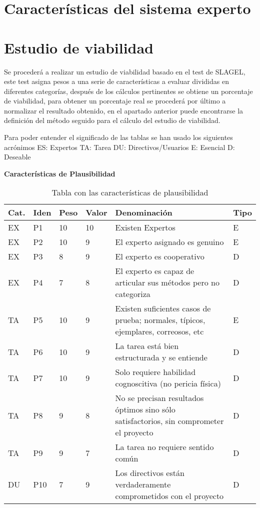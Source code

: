 \section{Características del sistema experto}



\section{Estudio de viabilidad}
Se procederá a realizar un estudio de viabilidad basado en el test de SLAGEL, este test
 asigna pesos a una serie de características a evaluar divididas en diferentes categorías,
 después de los cálculos pertinentes se obtiene un porcentaje de viabilidad, para obtener
 un porcentaje real se procederá por último a normalizar el resultado obtenido, en el apartado
 anterior puede encontrarse la definición del método seguido para el cálculo del estudio de
 viabilidad.

Para poder entender el significado de las tablas se han usado los siguientes acrónimos
 ES: Expertos TA: Tarea DU: Directivos/Usuarios E: Esencial D: Deseable

\textbf{Características de Plausibilidad}

\begin{table}[htb]%
  \centering
  \caption{Tabla con las características de plausibilidad}
  \label{tab:anchura}
  \begin{tabular}{ | l | l | l | l | p{8cm} | l | }
    \hline
    Cat. & Iden & Peso & Valor & Denominación & Tipo \\ \hline
    EX & P1 & 10 & 10 & Existen Expertos & E \\ \hline
    EX & P2 &  10 & 9 & El experto asignado es genuino & E \\ \hline
    EX & P3 & 8 & 9 & El experto es cooperativo & D \\ \hline
    EX & P4 & 7 & 8 & El experto es capaz de articular sus métodos pero no categoriza & D \\ \hline
    TA & P5 & 10 & 9 & Existen suficientes casos de prueba; normales, típicos, ejemplares, correosos, etc & E \\ \hline
    TA & P6 & 10 & 9 & La tarea está bien estructurada y se entiende & D \\ \hline
    TA & P7 & 10 & 9 & Solo requiere habilidad cognoscitiva (no pericia física) & D \\ \hline
    TA & P8 & 9 & 8 & No se precisan resultados óptimos sino sólo satisfactorios, sin comprometer el proyecto & D \\ \hline
    TA & P9 & 9 & 7 & La tarea no requiere sentido común & D \\ \hline
    DU & P10 & 7 & 9 & Los directivos están verdaderamente comprometidos con el proyecto & D \\ \hline
  \end{tabular}
\end{table}

